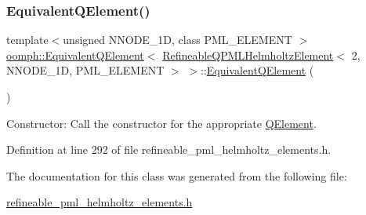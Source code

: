 \subsubsection{\texorpdfstring{Equivalent\+Q\+Element()}{EquivalentQElement()}}
{\footnotesize\ttfamily template$<$unsigned N\+N\+O\+D\+E\+\_\+1D, class P\+M\+L\+\_\+\+E\+L\+E\+M\+E\+NT $>$ \\
\hyperlink{classoomph_1_1EquivalentQElement}{oomph\+::\+Equivalent\+Q\+Element}$<$ \hyperlink{classoomph_1_1RefineableQPMLHelmholtzElement}{Refineable\+Q\+P\+M\+L\+Helmholtz\+Element}$<$ 2, N\+N\+O\+D\+E\+\_\+1D, P\+M\+L\+\_\+\+E\+L\+E\+M\+E\+NT $>$ $>$\+::\hyperlink{classoomph_1_1EquivalentQElement}{Equivalent\+Q\+Element} (\begin{DoxyParamCaption}{ }\end{DoxyParamCaption})\hspace{0.3cm}{\ttfamily [inline]}}



Constructor\+: Call the constructor for the appropriate \hyperlink{classoomph_1_1QElement}{Q\+Element}. 



Definition at line 292 of file refineable\+\_\+pml\+\_\+helmholtz\+\_\+elements.\+h.



The documentation for this class was generated from the following file\+:\begin{DoxyCompactItemize}
\item 
\hyperlink{refineable__pml__helmholtz__elements_8h}{refineable\+\_\+pml\+\_\+helmholtz\+\_\+elements.\+h}\end{DoxyCompactItemize}
